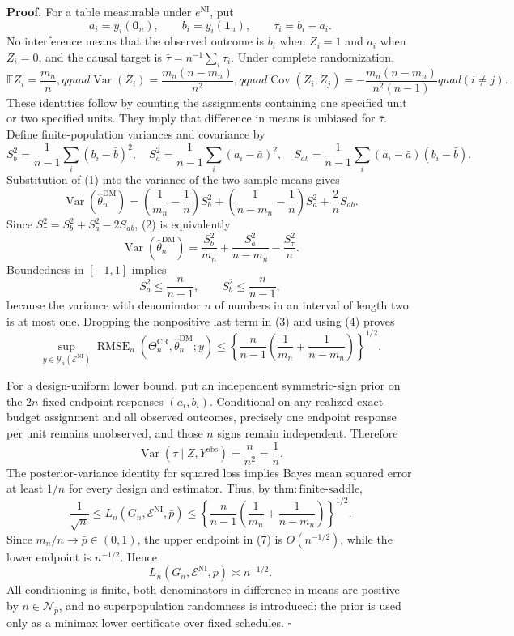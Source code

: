 \textbf{Proof.}
For a table measurable under \(e^{\mathrm{NI}}\), put
\[
 a_i=y_i(\mathbf 0_n),\qquad b_i=y_i(\mathbf 1_n),
 \qquad \tau_i=b_i-a_i.
\]
No interference means that the observed outcome is \(b_i\) when \(Z_i=1\) and \(a_i\) when \(Z_i=0\), and the causal target is \(\bar\tau=n^{-1}\sum_i\tau_i\).  Under complete randomization,
\[
 \mathbb E Z_i=\frac{m_n}{n},qquad
 \operatorname{Var}(Z_i)=\frac{m_n(n-m_n)}{n^2},qquad
 \operatorname{Cov}(Z_i,Z_j)
 =-\frac{m_n(n-m_n)}{n^2(n-1)}quad(i\ne j). \tag{1}
\]
These identities follow by counting the assignments containing one specified unit or two specified units.  They imply that difference in means is unbiased for \(\bar\tau\).  Define finite-population variances and covariance by
\[
 S_b^2=\frac1{n-1}\sum_i(b_i-\bar b)^2,
 \quad
 S_a^2=\frac1{n-1}\sum_i(a_i-\bar a)^2,
 \quad
 S_{ab}=\frac1{n-1}\sum_i(a_i-\bar a)(b_i-\bar b).
\]
Substitution of (1) into the variance of the two sample means gives
\[
 \operatorname{Var}(\widehat\theta_n^{\mathrm{DM}})
 =\left(\frac1{m_n}-\frac1n\right)S_b^2
  +\left(\frac1{n-m_n}-\frac1n\right)S_a^2
  +\frac{2}{n}S_{ab}. \tag{2}
\]
Since \(S_\tau^2=S_b^2+S_a^2-2S_{ab}\), (2) is equivalently
\[
 \operatorname{Var}(\widehat\theta_n^{\mathrm{DM}})
 =\frac{S_b^2}{m_n}+\frac{S_a^2}{n-m_n}-\frac{S_\tau^2}{n}. \tag{3}
\]
Boundedness in \([-1,1]\) implies
\[
 S_a^2\le\frac{n}{n-1},
 \qquad
 S_b^2\le\frac{n}{n-1}, \tag{4}
\]
because the variance with denominator \(n\) of numbers in an interval of length two is at most one.  Dropping the nonpositive last term in (3) and using (4) proves
\[
 \sup_{y\in\mathcal Y_n(\mathcal E^{\mathrm{NI}})}
 \operatorname{RMSE}_n(\Theta_n^{\mathrm{CR}},
 \widehat\theta_n^{\mathrm{DM}};y)
 \le
 \left\{\frac{n}{n-1}
 \left(\frac1{m_n}+\frac1{n-m_n}\right)\right\}^{1/2}. \tag{5}
\]

For a design-uniform lower bound, put an independent symmetric-sign prior on the \(2n\) fixed endpoint responses \((a_i,b_i)\).  Conditional on any realized exact-budget assignment and all observed outcomes, precisely one endpoint response per unit remains unobserved, and those \(n\) signs remain independent.  Therefore
\[
 \operatorname{Var}(\bar\tau\mid Z,Y^{\mathrm{obs}})
 =\frac{n}{n^2}=\frac1n. \tag{6}
\]
The posterior-variance identity for squared loss implies Bayes mean squared error at least \(1/n\) for every design and estimator.  Thus, by \(\mathrm{thm{:}finite\text{-}saddle}\),
\[
 \frac1{\sqrt n}
 \le L_n(G_n,\mathcal E^{\mathrm{NI}},\bar p)
 \le
 \left\{\frac{n}{n-1}
 \left(\frac1{m_n}+\frac1{n-m_n}\right)\right\}^{1/2}. \tag{7}
\]
Since \(m_n/n\to\bar p\in(0,1)\), the upper endpoint in (7) is \(O(n^{-1/2})\), while the lower endpoint is \(n^{-1/2}\).  Hence
\[
 L_n(G_n,\mathcal E^{\mathrm{NI}},\bar p)\asymp n^{-1/2}.
\]
All conditioning is finite, both denominators in difference in means are positive by \(n\in\mathcal N_{\bar p}\), and no superpopulation randomness is introduced: the prior is used only as a minimax lower certificate over fixed schedules. \(\square\)